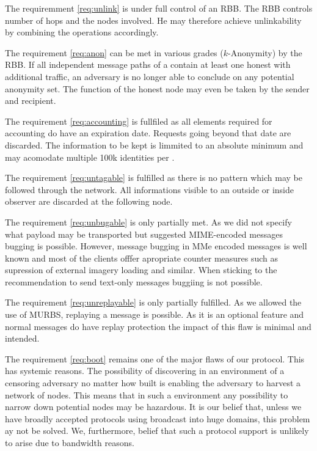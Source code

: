 The requiremment \ref{req:unlink} is under full control of an RBB. The RBB controls number of hops and the nodes involved. He may therefore achieve unlinkability by combining the operations accordingly.

The requirement \ref{req:anon} can be met in various grades ($k$-Anonymity) by the RBB. If all independent message paths of a \VortexMessage{} contain at least one honest \VortexNode{} with additional traffic, an adversary is no longer able to conclude on any potential anonymity set. The function of the honest node may even be taken by the sender and recipient.

The requirement \ref{req:accounting} is fullfiled as all elements required for accounting do have an expiration date. Requests going beyond that date are discarded. The information to be kept is limmited to an absolute minimum and may acomodate multiple 100k identities per \VortexNode.

The requirement \ref{req:untagable} is fulfilled as there is no pattern which may be followed through the network. All informations visible to an outside or inside observer are discarded at the following node.

The requirement \ref{req:unbugable} is only partially met. As we did not specify what payload may be transported but suggested MIME-encoded messages bugging is possible. However, message bugging in MMe encoded messages is well known and most of the clients offfer apropriate counter measures such as supression of external imagery loading and similar. When sticking to the recommendation to send text-only messages buggiing is not possible.

The requirement \ref{req:unreplayable} is only partially fulfilled. As we allowed the use of MURBS, replaying a message is possible. As it is an optional feature and normal messages do have replay protection the impact of this flaw is minimal and intended.

The requirement \ref{req:boot} remains one of the major flaws of our protocol. This has systemic reasons. The possibility of discovering \VortexNodes{} in an environment of a censoring adversary no matter how built is enabling the adversary to harvest a network of nodes. This means that in such a environment any possibility to narrow down potential nodes may be hazardous. It is our belief that, unless we have broadly accepted protocols using broadcast into huge domains, this problem ay not be solved. We, furthermore, belief that such a protocol support is unlikely to arise due to bandwidth reasons. 

